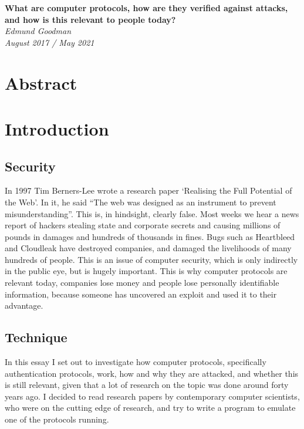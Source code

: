\documentclass{article}
\begin{document}
\begin{titlepage}
    \vspace*{\fill}
    \begin{center}
        \Huge\textbf{What are computer protocols, how are they verified against attacks, and how is this relevant to people today?}\\
        \huge\textit{Edmund Goodman}\\
        \huge\textit{August 2017 / May 2021}
    \end{center}
    \vspace*{\fill}
\end{titlepage}

\section{Abstract}


\addtocounter{section}{1}
\tableofcontents


\section{Introduction}
\subsection{Security}
In 1997 Tim Berners-Lee wrote a research paper ‘Realising the Full Potential of
the Web’. In it, he said “The web was designed as an instrument to prevent
misunderstanding”. This is, in hindsight, clearly false. Most weeks we hear a
news report of hackers  stealing state and corporate secrets and causing
millions of pounds in damages and hundreds of thousands in fines. Bugs such as
Heartbleed and Cloudleak have destroyed companies, and damaged the
livelihoods of many hundreds of people. This is an issue of computer security,
which is only indirectly in the public eye, but is hugely important.  This is
why computer protocols are relevant today, companies lose money and people lose
personally identifiable information, because someone has uncovered an exploit
and used it to their advantage.

\subsection{Technique}
In this essay I set out to investigate how computer protocols, specifically
authentication protocols, work, how and why they are attacked, and whether this
is still relevant, given that a lot of research on the topic was done around
forty years ago. I decided to read research papers by contemporary computer
scientists, who were on the cutting edge of research, and try to write a program
to emulate one of the protocols running.
\end{document}
